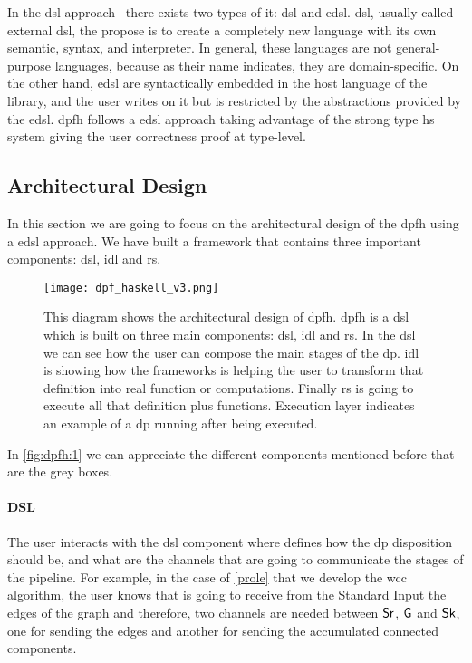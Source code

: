 In the \acrfull{dsl} approach~\cite{dsl} there exists two types of it: \acrfull{dsl} and \acrfull{edsl}. \acrshort{dsl}, usually called external \acrshort{dsl}, the propose is to create a completely new language with its own semantic, syntax, and interpreter. 
In general, these languages are not general-purpose languages, because as their name indicates, they are domain-specific. On the other hand, \acrshort{edsl} are syntactically embedded in the host language of the library, and the user writes on it but is restricted by the abstractions provided by the \acrshort{edsl}.
\acrshort{dpfh} follows a \acrshort{edsl} approach taking advantage of the strong type \acrshort{hs} system giving the user correctness proof at type-level.

\subsection{Architectural Design}
In this section we are going to focus on the architectural design of the \acrshort{dpfh} using a \acrshort{edsl} approach. We have built a framework that contains
three important components: \acrshort{dsl}, \acrshort{idl} and \acrshort{rs}. 

\begin{figure}[!ht]
  \centering
  \begin{minipage}{\textwidth}
   \texttt{[image: dpf\_haskell\_v3.png]}
    \caption[{[\acrshort{dpfh}] Architectural design of \acrshort{dpfh}}]{This diagram shows the architectural design of \acrshort{dpfh}. \acrshort{dpfh} is a \acrshort{dsl} which is built on three main components: \acrshort{dsl}, \acrshort{idl} and \acrshort{rs}. In the \acrshort{dsl} we can see how the user can compose the main stages of the \acrshort{dp}. \acrshort{idl} is showing how the frameworks is helping the user to transform that definition into real function or computations. Finally \acrshort{rs} is going to execute all that definition plus functions. Execution layer indicates an example of a \acrshort{dp} running after being executed.}
    \label{fig:dpfh:1}
  \end{minipage}
\end{figure}

In \autoref{fig:dpfh:1} we can appreciate the different components mentioned before that are the grey boxes.

\paragraph{DSL} The user interacts with the \acrshort{dsl} component where defines how the \acrshort{dp} disposition
should be, and what are the channels that are going to communicate the stages of the pipeline. For example, in the
case of \autoref{prole} that we develop the \acrshort{wcc} algorithm, the user knows that is going to receive from the Standard Input 
the edges of the graph and therefore, two channels are needed between $\mathsf{Sr}$, $\mathsf{G}$ and $\mathsf{Sk}$, one for sending the edges and another for sending
the accumulated connected components. 

